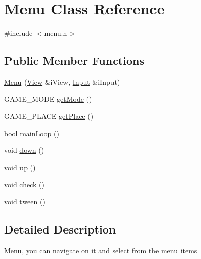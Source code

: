 \hypertarget{class_menu}{\section{Menu Class Reference}
\label{class_menu}
}


{\ttfamily \#include $<$menu.\-h$>$}

\subsection*{Public Member Functions}
\begin{DoxyCompactItemize}
\item 
\hyperlink{class_menu_a1163d6002a077a961278eee37aebadd5}{Menu} (\hyperlink{class_view}{View} \&i\-View, \hyperlink{class_input}{Input} \&i\-Input)
\item 
G\-A\-M\-E\-\_\-\-M\-O\-D\-E \hyperlink{class_menu_a663084989a68acd180827f3d49ae03e7}{get\-Mode} ()
\item 
G\-A\-M\-E\-\_\-\-P\-L\-A\-C\-E \hyperlink{class_menu_a2607530be3da88e731e174744cd9a5fa}{get\-Place} ()
\item 
bool \hyperlink{class_menu_ad5867c5b6e3be6243ae9653bcf65356a}{main\-Loop} ()
\item 
void \hyperlink{class_menu_a70ac96b2e6bc501f41823a8ecbba6511}{down} ()
\item 
void \hyperlink{class_menu_a6f91bf05fc6ebc48669f41ac5c960811}{up} ()
\item 
void \hyperlink{class_menu_a9d5c2782e9f319a45f1e03eb305445bf}{check} ()
\item 
void \hyperlink{class_menu_a27a6d51ae7c6a00a78b89f065b045616}{tween} ()
\end{DoxyCompactItemize}


\subsection{Detailed Description}
\hyperlink{class_menu}{Menu}, you can navigate on it and select from the menu items 

